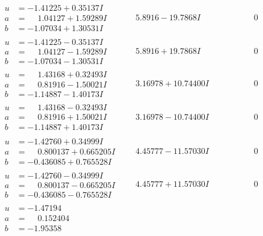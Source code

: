 \documentclass[1p]{elsarticle_modified}
\theoremstyle{definition}
\begin{document}
$$\begin{array}{c|c|c}
\begin{aligned}
u &= -1.41225 + 0.35137 I \\
a &= \phantom{-}1.04127 + 1.59289 I \\
b &= -1.07034 + 1.30531 I\end{aligned}
 & \phantom{-}5.8916 - 19.7868 I & \phantom{-0.000000 } 0 \\ \hline\begin{aligned}
u &= -1.41225 - 0.35137 I \\
a &= \phantom{-}1.04127 - 1.59289 I \\
b &= -1.07034 - 1.30531 I\end{aligned}
 & \phantom{-}5.8916 + 19.7868 I & \phantom{-0.000000 } 0 \\ \hline\begin{aligned}
u &= \phantom{-}1.43168 + 0.32493 I \\
a &= \phantom{-}0.81916 - 1.50021 I \\
b &= -1.14887 - 1.40173 I\end{aligned}
 & \phantom{-}3.16978 + 10.74400 I & \phantom{-0.000000 } 0 \\ \hline\begin{aligned}
u &= \phantom{-}1.43168 - 0.32493 I \\
a &= \phantom{-}0.81916 + 1.50021 I \\
b &= -1.14887 + 1.40173 I\end{aligned}
 & \phantom{-}3.16978 - 10.74400 I & \phantom{-0.000000 } 0 \\ \hline\begin{aligned}
u &= -1.42760 + 0.34999 I \\
a &= \phantom{-}0.800137 + 0.665205 I \\
b &= -0.436085 + 0.765528 I\end{aligned}
 & \phantom{-}4.45777 - 11.57030 I & \phantom{-0.000000 } 0 \\ \hline\begin{aligned}
u &= -1.42760 - 0.34999 I \\
a &= \phantom{-}0.800137 - 0.665205 I \\
b &= -0.436085 - 0.765528 I\end{aligned}
 & \phantom{-}4.45777 + 11.57030 I & \phantom{-0.000000 } 0 \\ \hline\begin{aligned}
u &= -1.47194\phantom{ +0.000000I} \\
a &= \phantom{-}0.152404\phantom{ +0.000000I} \\
b &= -1.95358\phantom{ +0.000000I}\end{aligned}

\end{array}$$
\end{document}
